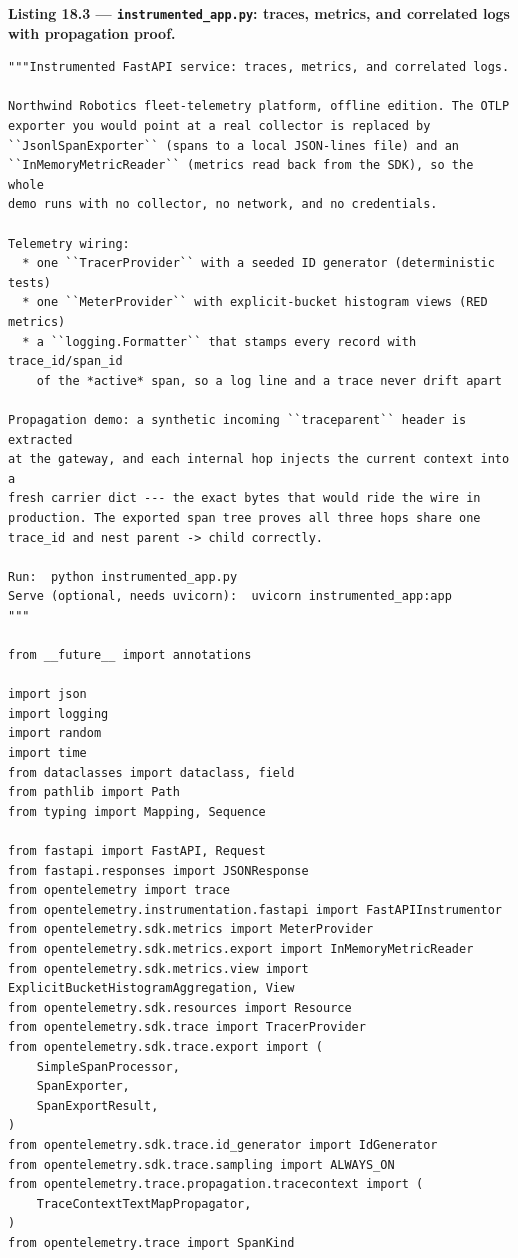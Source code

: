 \noindent\textbf{Listing 18.3 --- \texttt{instrumented\_app.py}: traces,
metrics, and correlated logs with propagation proof.}
\label{lst:ch18-instrumented-app}
\begin{verbatim}
"""Instrumented FastAPI service: traces, metrics, and correlated logs.

Northwind Robotics fleet-telemetry platform, offline edition. The OTLP
exporter you would point at a real collector is replaced by
``JsonlSpanExporter`` (spans to a local JSON-lines file) and an
``InMemoryMetricReader`` (metrics read back from the SDK), so the whole
demo runs with no collector, no network, and no credentials.

Telemetry wiring:
  * one ``TracerProvider`` with a seeded ID generator (deterministic tests)
  * one ``MeterProvider`` with explicit-bucket histogram views (RED metrics)
  * a ``logging.Formatter`` that stamps every record with trace_id/span_id
    of the *active* span, so a log line and a trace never drift apart

Propagation demo: a synthetic incoming ``traceparent`` header is extracted
at the gateway, and each internal hop injects the current context into a
fresh carrier dict --- the exact bytes that would ride the wire in
production. The exported span tree proves all three hops share one
trace_id and nest parent -> child correctly.

Run:  python instrumented_app.py
Serve (optional, needs uvicorn):  uvicorn instrumented_app:app
"""

from __future__ import annotations

import json
import logging
import random
import time
from dataclasses import dataclass, field
from pathlib import Path
from typing import Mapping, Sequence

from fastapi import FastAPI, Request
from fastapi.responses import JSONResponse
from opentelemetry import trace
from opentelemetry.instrumentation.fastapi import FastAPIInstrumentor
from opentelemetry.sdk.metrics import MeterProvider
from opentelemetry.sdk.metrics.export import InMemoryMetricReader
from opentelemetry.sdk.metrics.view import ExplicitBucketHistogramAggregation, View
from opentelemetry.sdk.resources import Resource
from opentelemetry.sdk.trace import TracerProvider
from opentelemetry.sdk.trace.export import (
    SimpleSpanProcessor,
    SpanExporter,
    SpanExportResult,
)
from opentelemetry.sdk.trace.id_generator import IdGenerator
from opentelemetry.sdk.trace.sampling import ALWAYS_ON
from opentelemetry.trace.propagation.tracecontext import (
    TraceContextTextMapPropagator,
)
from opentelemetry.trace import SpanKind


\end{verbatim}
